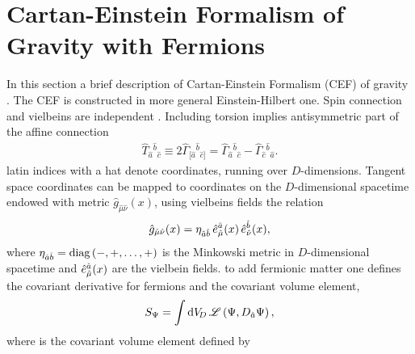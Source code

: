 \section{\label{sec:CEF}Cartan-Einstein Formalism of Gravity with Fermions}

In this section a brief description of Cartan-Einstein Formalism (CEF) of gravity  . The CEF is constructed in more general   Einstein-Hilbert one. Spin connection and vielbeins are independent  . Including torsion  implies   antisymmetric part of the affine connection
\begin{align}
  \hat{T}_{\hat{a}}{}^{\hat{b}}{}_{\hat{c}} \equiv 2\hat{\Gamma}_{[\hat{a}}{}^{\hat{b}}{}_{\hat{c}]} = \hat{\Gamma}_{\hat{a}}{}^{\hat{b}}{}_{\hat{c}} - \hat{\Gamma}_{\hat{c}}{}^{\hat{b}}{}_{\hat{a}}.
\end{align}
 latin indices with a hat denote   coordinates, running over $D$-dimensions.  Tangent space coordinates can be mapped to coordinates on the  $D$-dimensional spacetime endowed with   metric $\hat{g}_{\hat{\mu}\hat{\nu}}(x)$, using vielbeins fields   the relation
\begin{equation}
  \label{metricrelation}
  \hat{g}_{\hat{\mu}\hat{\nu}}(x) = {\eta}_{\hat{a}\hat{b}}\,\hat{e}^{\hat{a}}_{\hat{\mu}}(x)\,\hat{e}^{\hat{b}}_{\hat{\nu}}(x),
\end{equation}
where ${\eta}_{\hat{a}\hat{b}} = \operatorname{diag}{\left(-,+,\ldots,+\right)}$ is the Minkowski metric in $D$-dimensional spacetime and $\hat{e}^{\hat{a}}_{\hat{\mu}}(x)$ are the vielbein fields.   to add fermionic matter 
one defines the covariant derivative for fermions and the covariant volume element,
\begin{equation}
  S_\Psi = \int \dv[D]%
  \,\Lag\left(\Psi,D_{\hat{a}}\Psi\right),
\end{equation}
where \dv[D] %
is the covariant volume element defined by
